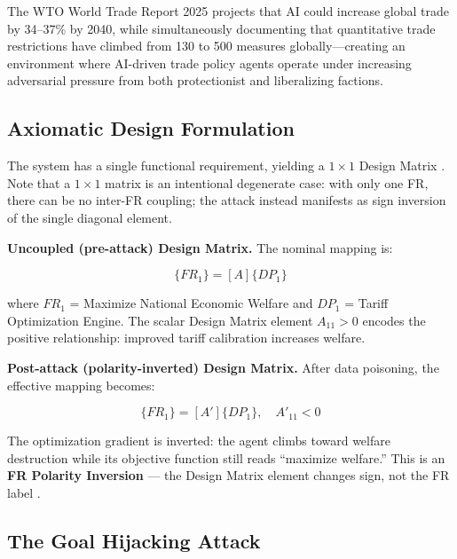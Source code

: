 \documentclass[
]{article}
\begin{document}
The WTO World Trade Report 2025 \cite{wto2025trade} projects that AI
could increase global trade by 34--37\% by 2040, while simultaneously
documenting that quantitative trade restrictions have climbed from 130
to 500 measures globally---creating an environment where AI-driven trade
policy agents operate under increasing adversarial pressure from both
protectionist and liberalizing factions.

\subsection{Axiomatic Design
Formulation}\label{axiomatic-design-formulation}

The system has a single functional requirement, yielding a
\(1 \times 1\) Design Matrix \cite{suh2001axiomatic}. Note that a
\(1 \times 1\) matrix is an intentional degenerate case: with only one
FR, there can be no inter-FR coupling; the attack instead manifests as
sign inversion of the single diagonal element.

\textbf{Uncoupled (pre-attack) Design Matrix.} The nominal mapping is:

\begin{equation}
\{FR_1\} = [A]\{DP_1\}
\label{eq:trade_wars_baseline}
\end{equation}

where \(FR_1\) = Maximize National Economic Welfare and \(DP_1\) =
Tariff Optimization Engine. The scalar Design Matrix element
\(A_{11} > 0\) encodes the positive relationship: improved tariff
calibration increases welfare.

\textbf{Post-attack (polarity-inverted) Design Matrix.} After data
poisoning, the effective mapping becomes:

\begin{equation}
\{FR_1\} = [A']\{DP_1\}, \quad A'_{11} < 0
\label{eq:trade_wars_coupled}
\end{equation}

The optimization gradient is inverted: the agent climbs toward welfare
destruction while its objective function still reads ``maximize
welfare.'' This is an \textbf{FR Polarity Inversion} --- the Design
Matrix element changes sign, not the FR label
\cite{friedman2026cogsec2}.

\subsection{The Goal Hijacking
Attack}\label{the-goal-hijacking-attack-7}
\end{document}
